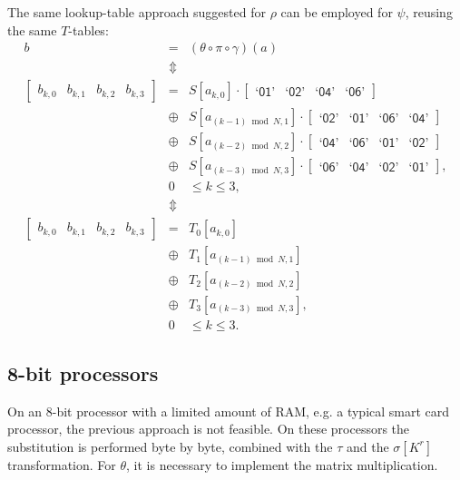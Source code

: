 \documentclass{llncs}
\newcommand{\gf}[1]{\textsf{`#1'}}
\begin{document}
The same lookup-table approach suggested for $\rho$ can be
employed for $\psi$, reusing the same $T$-tables:
\begin{eqnarray*}
b &=& (\theta \circ \pi \circ \gamma) (a) \\
 & \Updownarrow & \\
 \left[ \begin{array}{cccc} b_{k,0} & b_{k,1} & b_{k,2} & b_{k,3} \end{array} \right] &=& %
 S[a_{k,0}] \cdot [ \begin{array}{cccc} \gf{01} & \gf{02} & \gf{04} & \gf{06} \end{array} ] \\%
 & \oplus &
 S[a_{(k-1)\bmod N,1}] \cdot [ \begin{array}{cccc} \gf{02} & \gf{01} & \gf{06} & \gf{04} \end{array} ] \\
 & \oplus &
 S[a_{(k-2)\bmod N,2}] \cdot [ \begin{array}{cccc} \gf{04} & \gf{06} & \gf{01} & \gf{02} \end{array} ] \\%
 & \oplus &
 S[a_{(k-3)\bmod N,3}] \cdot [ \begin{array}{cccc} \gf{06} & \gf{04} & \gf{02} & \gf{01} \end{array} ],\\
 & 0 & \leqslant k \leqslant 3,\\
 & \Updownarrow & \\
 \left[ \begin{array}{cccc} b_{k,0} & b_{k,1} & b_{k,2} & b_{k,3} \end{array} \right] &=& %
 T_0[a_{k,0}]\\ %
 & \oplus &
 T_1[a_{(k-1)\bmod N,1}]\\
 & \oplus &
 T_2[a_{(k-2)\bmod N,2}]\\ %
 & \oplus &
 T_3[a_{(k-3)\bmod N,3}],\\
& 0 & \leqslant k \leqslant 3.
\end{eqnarray*}

\subsection{8-bit processors}\label{smart-cards}

On an 8-bit processor with a limited amount of RAM, e.g. a
typical smart card processor, the previous approach is not
feasible. On these processors the substitution is performed byte
by byte, combined with the $\tau$ and the $\sigma[K^r]$
transformation. For $\theta$, it is necessary to implement the
matrix multiplication.
\end{document}
